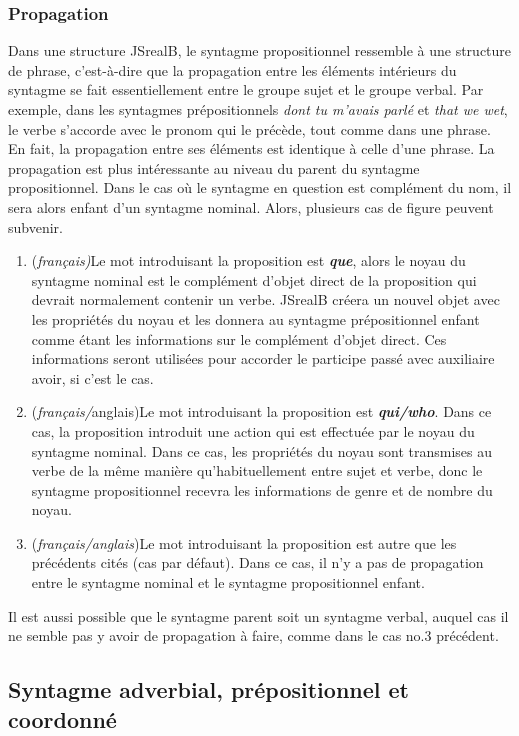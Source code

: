 \documentclass[11pt]{article} %
\begin{document}
\subsubsection{Propagation}

Dans une structure JSrealB, le syntagme propositionnel ressemble à
une structure de phrase, c'est-à-dire que la propagation entre les
éléments intérieurs du syntagme se fait essentiellement entre le groupe
sujet et le groupe verbal. Par exemple, dans les syntagmes prépositionnels
\emph{dont tu m'avais parlé }et \emph{that we wet}, le verbe s'accorde
avec le pronom qui le précède, tout comme dans une phrase. En fait,
la propagation entre ses éléments est identique à celle d'une phrase.
La propagation est plus intéressante au niveau du parent du syntagme
propositionnel. Dans le cas où le syntagme en question est complément
du nom, il sera alors enfant d'un syntagme nominal. Alors, plusieurs
cas de figure peuvent subvenir. 
\begin{enumerate}
\item (\emph{français)}Le mot introduisant la proposition est \textbf{\emph{que}},
alors le noyau du syntagme nominal est le complément d'objet direct
de la proposition qui devrait normalement contenir un verbe. JSrealB
créera un nouvel objet avec les propriétés du noyau et les donnera
au syntagme prépositionnel enfant comme étant les informations sur
le complément d'objet direct. Ces informations seront utilisées pour
accorder le participe passé avec auxiliaire avoir, si c'est le cas.
\item (\emph{français/}anglais)Le mot introduisant la proposition est \textbf{\emph{qui/who}}.
Dans ce cas, la proposition introduit une action qui est effectuée
par le noyau du syntagme nominal. Dans ce cas, les propriétés du noyau
sont transmises au verbe de la même manière qu'habituellement entre
sujet et verbe, donc le syntagme propositionnel recevra les informations
de genre et de nombre du noyau.
\item (\emph{français/anglais})Le mot introduisant la proposition est autre
que les précédents cités (cas par défaut). Dans ce cas, il n'y a pas
de propagation entre le syntagme nominal et le syntagme propositionnel
enfant. 
\end{enumerate}
Il est aussi possible que le syntagme parent soit un syntagme verbal,
auquel cas il ne semble pas y avoir de propagation à faire, comme
dans le cas no.3 précédent.

\subsection{Syntagme adverbial, prépositionnel et coordonné}
\end{document}
